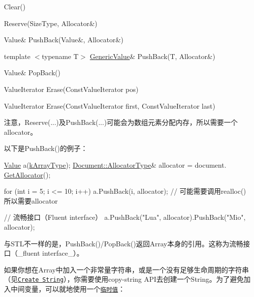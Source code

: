 \begin{DoxyItemize}
\item {\ttfamily Clear()}
\item {\ttfamily Reserve(\+Size\+Type, Allocator\&)}
\item {\ttfamily Value\& Push\+Back(\+Value\&, Allocator\&)}
\item {\ttfamily template $<$typename T$>$ \hyperlink{class_generic_value}{Generic\+Value}\& Push\+Back(\+T, Allocator\&)}
\item {\ttfamily Value\& Pop\+Back()}
\item {\ttfamily Value\+Iterator Erase(\+Const\+Value\+Iterator pos)}
\item {\ttfamily Value\+Iterator Erase(\+Const\+Value\+Iterator first, Const\+Value\+Iterator last)}
\end{DoxyItemize}

注意，{\ttfamily Reserve(...)}及{\ttfamily Push\+Back(...)}可能会为数组元素分配内存，所以需要一个allocator。

以下是{\ttfamily Push\+Back()}的例子：


\begin{DoxyCode}
\hyperlink{class_generic_value}{Value} a(\hyperlink{rapidjson_8h_a1d1cfd8ffb84e947f82999c682b666a7af41527d6925efa3c5c3dadb23dfef7c8}{kArrayType});
\hyperlink{class_generic_document_a35155b912da66ced38d22e2551364c57}{Document::AllocatorType}& allocator = document.
      \hyperlink{class_generic_document_aa4609d6b19f86aec1a6b96edf2c27686}{GetAllocator}();

\textcolor{keywordflow}{for} (\textcolor{keywordtype}{int} i = 5; i <= 10; i++)
    a.PushBack(i, allocator);   \textcolor{comment}{// 可能需要调用realloc()所以需要allocator}

\textcolor{comment}{// 流畅接口（Fluent interface）}
a.PushBack(\textcolor{stringliteral}{"Lua"}, allocator).PushBack(\textcolor{stringliteral}{"Mio"}, allocator);
\end{DoxyCode}


与\+S\+T\+L不一样的是，{\ttfamily Push\+Back()}/{\ttfamily Pop\+Back()}返回\+Array本身的引用。这称为流畅接口（\+\_\+fluent interface\+\_\+）。

如果你想在\+Array中加入一个非常量字符串，或是一个没有足够生命周期的字符串（见\href{#CreateString}{\tt Create String}），你需要使用copy-\/string A\+P\+I去创建一个\+String。为了避免加入中间变量，可以就地使用一个\href{#TemporaryValues}{\tt 临时值}：


